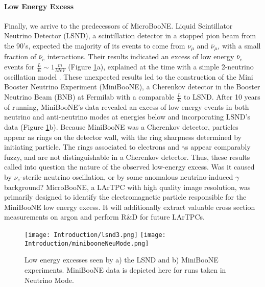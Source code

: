 \paragraph{Low Energy Excess} %
Finally, we arrive to the predecessors of MicroBooNE. Liquid Scintillator Neutrino Detector (LSND), a scintillation detector in a stopped pion beam from the 90's, expected the majority of its events to come from $\nu_\mu$ and $\bar{\nu}_\mu$, with a small fraction of $\bar{\nu}_e$ interactions. Their results indicated an excess of low energy $\bar{\nu}_e$ events for $\frac{L}{E} \sim 1 \frac{m}{MeV}$ (Figure \ref{fig:lsnd}a), explained at the time with a simple 2-neutrino oscillation model \cite{bib:lsnd}. These unexpected results led to the construction of the Mini Booster Neutrino Experiment (MiniBooNE), a Cherenkov detector in the Booster Neutrino Beam (BNB) at Fermilab with a comparable $\frac{L}{E}$ to LSND. After 10 years of running, MiniBooNE's data revealed an excess of low energy events in both neutrino and anti-neutrino modes at energies below and incorporating LSND's data \cite{bib:miniboone} (Figure \ref{fig:lsnd}b). Because MiniBooNE was a Cherenkov detector, particles appear as rings on the detector wall, with the ring sharpness determined by initiating particle. The rings associated to electrons and $\gamma$s appear comparably fuzzy, and are not distinguishable in a Cherenkov detector. Thus, these results called into question the nature of the observed low-energy excess.  Was it caused by $\nu_e$-sterile neutrino oscillation, or by some anomalous neutrino-induced $\gamma$ background?  MicroBooNE, a LArTPC with high quality image resolution, was primarily designed to identify the electromagnetic particle responsible for the MiniBooNE low energy excess. It will additionally extract valuable cross section measurements on argon and perform R\&D for future LArTPCs. 
\begin{figure}[h!]
\centering
\texttt{[image: Introduction/lsnd3.png]}
\hspace{1.5 mm}
\texttt{[image: Introduction/minibooneNeuMode.png]}
\caption{Low energy excesses seen by a) the LSND and b) MiniBooNE experiments.  MiniBooNE data is depicted here for runs taken in Neutrino Mode.}
\label{fig:lsnd}
\end{figure}

